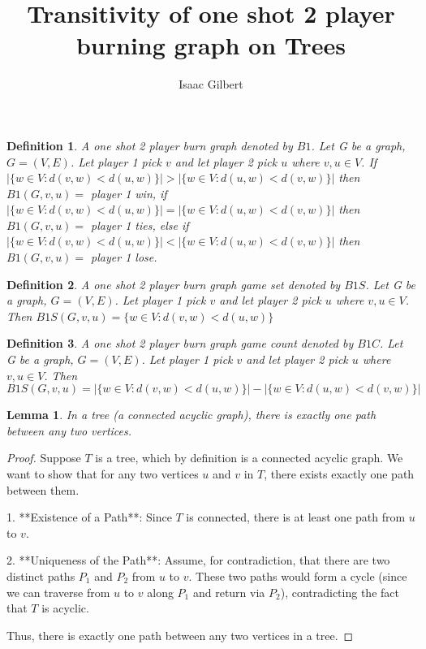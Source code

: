 \documentclass{article}
\newtheorem{lemma}{Lemma}
\newtheorem{definition}{Definition}
\begin{document}
\title{Transitivity of one shot 2 player burning graph on Trees}
\author{Isaac Gilbert}
\date{} %
\maketitle

\begin{definition}
A one shot 2 player burn graph denoted by \(B1\). Let G be a graph, \(G=(V,E)\). Let player 1 pick \(v\) and let player 2 pick \(u\) where \( v,u \in V \). If \(|\{ w \in V : d(v, w) < d(u, w) \}| > |\{ w \in V : d(u, w) < d(v, w) \}|\) then \(B1(G,v,u) =\) player 1 win, if \(|\{ w \in V : d(v, w) < d(u, w) \}| = |\{ w \in V : d(u, w) < d(v, w) \}|\) then \(B1(G,v,u) =\) player 1 ties, else if \(|\{ w \in V : d(v, w) < d(u, w) \}| < |\{ w \in V : d(u, w) < d(v, w) \}|\) then \(B1(G,v,u) =\) player 1 lose.
\end{definition}

\begin{definition}
A one shot 2 player burn graph game set denoted by \(B1S\). Let G be a graph, \(G=(V,E)\). Let player 1 pick \(v\) and let player 2 pick \(u\) where \( v,u \in V \). Then \(B1S(G,v,u) = \{ w \in V : d(v, w) < d(u, w) \}\)
\end{definition}

\begin{definition}
A one shot 2 player burn graph game count denoted by \(B1C\). Let G be a graph, \(G=(V,E)\). Let player 1 pick \(v\) and let player 2 pick \(u\) where \( v,u \in V \). Then \(B1S(G,v,u) = |\{ w \in V : d(v, w) < d(u, w) \}| - |\{ w \in V : d(u, w) < d(v, w) \}|\)
\end{definition}




\begin{lemma}
In a tree (a connected acyclic graph), there is exactly one path between any two vertices.
\end{lemma}

\begin{proof}
Suppose \( T \) is a tree, which by definition is a connected acyclic graph. We want to show that for any two vertices \( u \) and \( v \) in \( T \), there exists exactly one path between them.

1. **Existence of a Path**: Since \( T \) is connected, there is at least one path from \( u \) to \( v \).
   
2. **Uniqueness of the Path**: Assume, for contradiction, that there are two distinct paths \( P_1 \) and \( P_2 \) from \( u \) to \( v \). These two paths would form a cycle (since we can traverse from \( u \) to \( v \) along \( P_1 \) and return via \( P_2 \)), contradicting the fact that \( T \) is acyclic.

Thus, there is exactly one path between any two vertices in a tree.
\end{proof}
\end{document}
